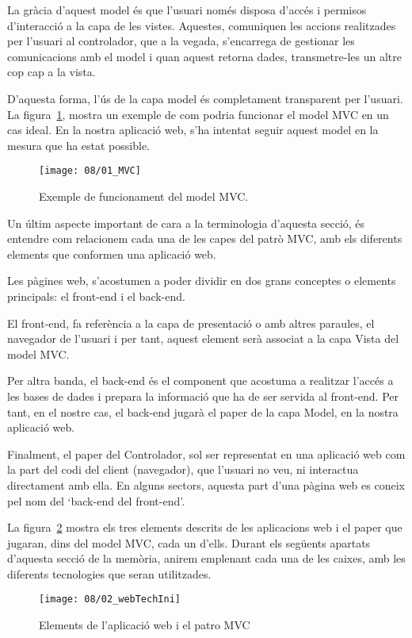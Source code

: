     La gràcia d'aquest model és que l'usuari només disposa d'accés i permisos d'in\-te\-rac\-ció a la capa de les vistes. Aquestes, comuniquen les accions realitzades per l'usuari al controlador, que a la vegada, s'encarrega de gestionar les comunicacions amb el model i quan aquest retorna dades, transmetre-les un altre cop cap a la vista.

    D'aquesta forma, l'ús de la capa model és completament transparent per l'usuari. La figura~\ref{fig:MVC}, mostra un exemple de com podria funcionar el model MVC en un cas ideal. En la nostra aplicació web, s'ha intentat seguir aquest model en la mesura que ha estat possible.

    \begin{figure}[h]
        \texttt{[image: 08/01\_MVC]}
        \centering
        \caption{Exemple de funcionament del model MVC.}\label{fig:MVC}
    \end{figure}

    Un últim aspecte important de cara a la terminologia d'aquesta secció, és entendre com relacionem cada una de les capes del patrò MVC, amb els diferents elements que conformen una aplicació web.

    Les pàgines web, s'acostumen a poder dividir en dos grans conceptes o elements principals: el front-end i el back-end.

    El front-end, fa referència a la capa de presentació o amb altres paraules, el navegador de l'usuari i per tant, aquest element serà associat a la capa Vista del model MVC.

    Per altra banda, el back-end és el component que acostuma a realitzar l'accés a les bases de dades i prepara la informació que ha de ser servida al front-end. Per tant, en el nostre cas, el back-end jugarà el paper de la capa Model, en la nostra aplicació web.

    Finalment, el paper del Controlador, sol ser representat en una aplicació web com la part del codi del client (navegador), que l'usuari no veu, ni interactua directament amb ella. En alguns sectors, aquesta part d'una pàgina web es coneix pel nom del `back-end del front-end'.

    La figura~\ref{fig:webElementsEmpty} mostra els tres elements descrits de les aplicacions web i el paper que jugaran, dins del model MVC, cada un d'ells. Durant els següents apartats d'aquesta secció de la memòria, anirem emplenant cada una de les caixes, amb les diferents tecnologies que seran utilitzades.

    \begin{figure}[h]
        \texttt{[image: 08/02\_webTechIni]}
        \centering
        \caption{Elements de l'aplicació web i el patro MVC}\label{fig:webElementsEmpty}
    \end{figure}
